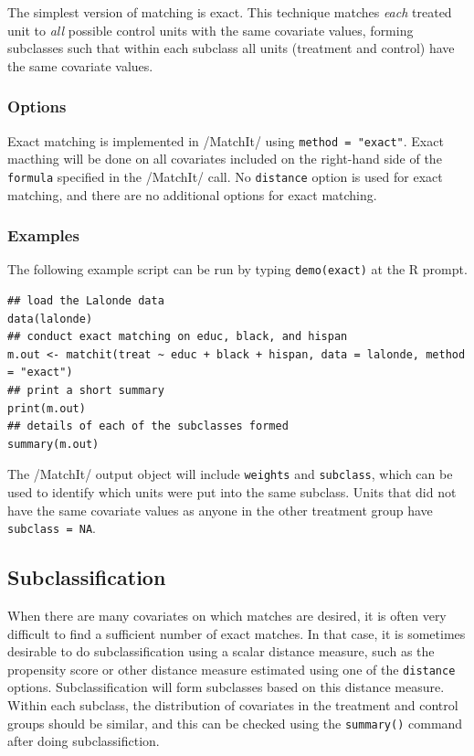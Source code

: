 \documentclass[oneside,letterpaper,titlepage]{article}
\begin{document}
The simplest version of matching is exact.  This technique matches
\emph{each} treated unit to \emph{all} possible control units with the
same covariate values, forming subclasses such that within each
subclass all units (treatment and control) have the same covariate
values.

\subsubsection{Options}

Exact matching is implemented in /MatchIt/ using \texttt{method =
  "exact"}.  Exact macthing will be done on all covariates included on
the right-hand side of the \texttt{formula} specified in the /MatchIt/
call.  No \texttt{distance} option is used for exact matching, and
there are no additional options for exact matching.

\subsubsection{Examples}

The following example script can be run by typing {\tt demo(exact)} at
the R prompt.

\begin{verbatim}
## load the Lalonde data
data(lalonde)
## conduct exact matching on educ, black, and hispan
m.out <- matchit(treat ~ educ + black + hispan, data = lalonde, method = "exact")
## print a short summary
print(m.out)
## details of each of the subclasses formed
summary(m.out)
\end{verbatim}

The /MatchIt/ output object will include \texttt{weights} and
\texttt{subclass}, which can be used to identify which units were put
into the same subclass.  Units that did not have the same covariate
values as anyone in the other treatment group have \texttt{subclass =
  NA}.

\subsection{Subclassification}
\label{subclass}

When there are many covariates on which matches are desired, it is
often very difficult to find a sufficient number of exact matches.  In
that case, it is sometimes desirable to do subclassification using a
scalar distance measure, such as the propensity score or other
distance measure estimated using one of the \texttt{distance} options.
Subclassification will form subclasses based on this distance measure.
Within each subclass, the distribution of covariates in the treatment
and control groups should be similar, and this can be checked using
the \texttt{summary()} command after doing subclassifiction.
\end{document}
